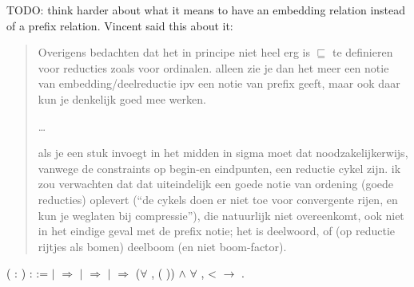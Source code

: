 TODO: think harder about what it means to have an embedding relation instead
of a prefix relation. Vincent said this about it:
\begin{quote}
Overigens bedachten dat het in principe niet heel erg is $\sqsubseteq$ te
definieren voor reducties zoals voor ordinalen. alleen zie je dan het meer een
notie van embedding/deelreductie ipv een notie van prefix geeft, maar ook daar
kun je denkelijk goed mee werken.

\ldots

als je een stuk invoegt in het midden in sigma moet dat noodzakelijkerwijs,
vanwege de constraints op begin-en eindpunten, een reductie cykel zijn. ik zou
verwachten dat dat uiteindelijk een goede notie van ordening (goede reducties)
oplevert (``de cykels doen er niet toe voor convergente rijen, en kun je
weglaten bij compressie''), die natuurlijk niet overeenkomt, ook niet in het
eindige geval met de prefix notie; het is deelwoord, of (op reductie rijtjes
als bomen) deelboom (en niet boom-factor).
\end{quote}

\begin{singlespace}
\begin{coqdoccode}
\coqdocnoindent
{} 
 
(\coqdocvar{$\varphi$} : 
) : 
:=\coqdoceol
\coqdocindent{1.00em}
 \coqdocvariable{$\varphi$} \coqdoceol
\coqdocindent{1.00em}
\ensuremath{|} 
\coqdocvar{\_}          \ensuremath{\Rightarrow}
\coqdoceol
\coqdocindent{1.00em}
\ensuremath{|} 
\coqdocvar{\_} \coqdocvar{\_} \coqdocvar{$\psi$} \coqdocvar{\_}
\coqdocvar{\_} \ensuremath{\Rightarrow}
\coqdocvariable{\coqdocvariable{$\psi$}}\coqdoceol
\coqdocindent{1.00em}
\ensuremath{|} 
\coqdocvar{\_} \coqdocvar{\_}  \coqdocvar{\_}
\coqdocvar{\_}  \ensuremath{\Rightarrow}
(\ensuremath{\forall} ,
 (
)) \ensuremath{\land}
\ensuremath{\forall}  , 
<  \ensuremath{\rightarrow} 
 \coqdoceol
\coqdocindent{1.00em}
.\coqdoceol
\end{coqdoccode}
\end{singlespace}


